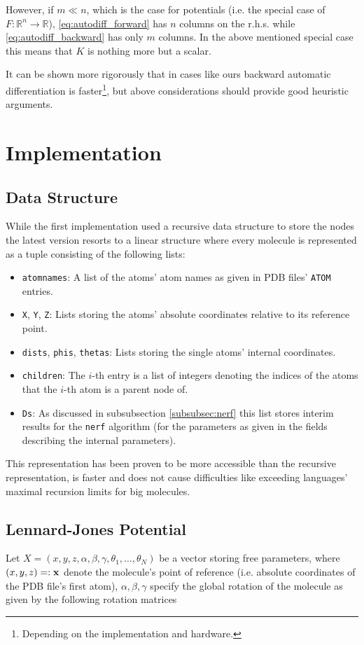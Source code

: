 \documentclass[12pt]{article}
\theoremstyle{definition}\newtheorem*{definition}{Definition}
\theoremstyle{definition}\newtheorem*{remark}{Remark}
\begin{document}
However, if $m \ll n$, which is the case for potentials (i.e. the special case of $F:\mathbb R^n \rightarrow \mathbb R$), \eqref{eq:autodiff_forward} has $n$ columns on the r.h.s. while \eqref{eq:autodiff_backward} has only $m$ columns. In the above mentioned special case this means that $K$ is nothing more but a scalar.

It can be shown more rigorously that in cases like ours backward automatic differentiation is faster\footnote{Depending on the implementation and hardware.}, but above considerations should provide good heuristic arguments.

\section{Implementation}

\subsection{Data Structure}
While the first implementation used a recursive data structure to store the nodes the latest version resorts to a linear structure where every molecule is represented as a tuple consisting of the following lists:

\begin{itemize}
	\item \texttt{atomnames}: A list of the atoms' atom names as given in PDB files' \texttt{ATOM} entries.
	\item \texttt{X}, \texttt{Y}, \texttt{Z}: Lists storing the atoms' absolute coordinates relative to its reference point.
	\item \texttt{dists}, \texttt{phis}, \texttt{thetas}: Lists storing the single atoms' internal coordinates.
	\item \texttt{children}: The $i$-th entry is a list of integers denoting the indices of the atoms that the $i$-th atom is a parent node of.
	\item \texttt{Ds}: As discussed in subsubsection \ref{subsubsec:nerf} this list stores interim results for the \texttt{nerf} algorithm (for the parameters as given in the fields describing the internal parameters).
\end{itemize}

This representation has been proven to be more accessible than the recursive representation, is faster and does not cause difficulties like exceeding languages' maximal recursion limits for big molecules.

\subsection{Lennard-Jones Potential}\label{subsec:LJ_implementation}
Let $X = (x,y,z,\alpha,\beta,\gamma,\theta_1,\dots,\theta_N)$ be a vector storing free parameters, where $(x,y,z)=:\bold x$ denote the molecule's point of reference (i.e. absolute coordinates of the PDB file's first atom), $\alpha,\beta,\gamma$ specify the global rotation of the molecule as given by the following rotation matrices
\end{document}
